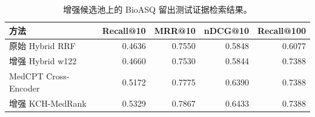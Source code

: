 \begin{table}[t]
\centering
\small
\caption{增强候选池上的 BioASQ 留出测试证据检索结果。}
\label{tab:enhanced-bioasq-main-results}
\begin{tabular}{lrrrr}
\toprule
方法 & Recall@10 & MRR@10 & nDCG@10 & Recall@100 \\
\midrule
原始 Hybrid RRF & 0.4636 & 0.7550 & 0.5848 & 0.6077 \\
增强 Hybrid w122 & 0.4660 & 0.7530 & 0.5844 & 0.7388 \\
MedCPT Cross-Encoder & 0.5172 & 0.7775 & 0.6390 & 0.7388 \\
增强 KCH-MedRank & 0.5329 & 0.7867 & 0.6433 & 0.7388 \\
\bottomrule
\end{tabular}
\end{table}
